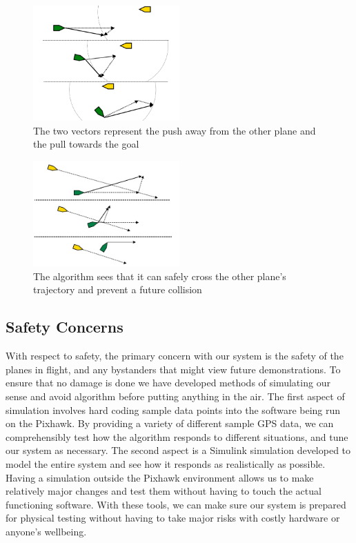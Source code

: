 \documentclass[12pt]{article}
\begin{document}
\begin{figure}[ht!]
   \centering
   \includegraphics[width=0.5\textwidth]{pushpull.png}
   \caption{The two vectors represent the push away from the other plane and the pull towards the goal}
\end{figure}

\begin{figure}[ht!]
   \centering
   \includegraphics[width=0.5\textwidth]{drift.png}
   \caption{The algorithm sees that it can safely cross the other plane's trajectory and prevent a future collision}
\end{figure}

\subsection{Safety Concerns}
With respect to safety, the primary concern with our system is the safety of the planes in flight, and any bystanders that might view future demonstrations. To ensure that no damage is done we have developed methods of simulating our sense and avoid algorithm before putting anything in the air. The first aspect of simulation involves hard coding sample data points into the software being run on the Pixhawk. By providing a variety of different sample GPS data, we can comprehensibly test how the algorithm responds to different situations, and tune our system as necessary. The second aspect is a Simulink simulation developed to model the entire system and see how it responds as realistically as possible. Having a simulation outside the Pixhawk environment allows us to make relatively major changes and test them without having to touch the actual functioning software. With these tools, we can make sure our system is prepared for physical testing without having to take major risks with costly hardware or anyone's wellbeing. 
\end{document}
